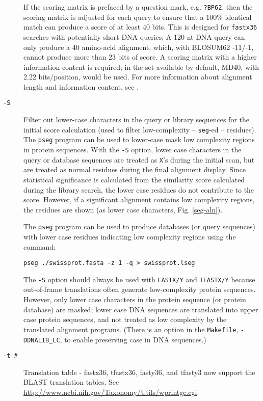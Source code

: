 \documentclass[11pt]{article}
\begin{document}
\begin{description}
If the scoring matrix is prefaced by a question mark,
e.g. \texttt{?BP62}, then the scoring matrix is adjusted for each
query to ensure that a 100\% identical match can produce a score of at
least 40 bits.  This is designed for \texttt{fastx36} searches with
potentially short DNA queries; A 120 nt DNA query can only produce a
40 amino-acid alignment, which, with BLOSUM62 -11/-1, cannot produce
more than 23 bits of score. A scoring matrix with a higher information
content is required; in the set available by default, MD40, with 2.22
bits/position, would be used.  For more information about alignment
length and information content, see \cite{alt915}.

\item[\texttt{-S}] Filter out lower-case characters in the query or
  library sequences for the initial score calculation (used to filter
  low-complexity -- \texttt{seg}-ed -- residues).  The \texttt{pseg}
  program \cite{woo935} can be used to lower-case mask low complexity
  regions in protein sequences. With the \texttt{-S} option, lower
  case characters in the query or database sequences are treated as
  \texttt{X}'s during the initial scan, but are treated as normal
  residues during the final alignment display.  Since statistical
  significance is calculated from the similarity score calculated
  during the library search, the lower case residues do not contribute
  to the score.  However, if a significant alignment contains low
  complexity regions, the residues are shown (as lower
  case characters, Fig. \ref{seg-aln}).

The \texttt{pseg} program can be used to produce databases (or query
sequences) with lower case residues indicating low complexity regions
using the command:
\begin{verbatim}
pseg ./swissprot.fasta -z 1 -q > swissprot.lseg
\end{verbatim}

The \texttt{-S} option should always be used with \texttt{FASTX/Y} and
\texttt{TFASTX/Y} because out-of-frame translations often generate
low-complexity protein sequences.  However, only lower case characters
in the protein sequence (or protein database) are masked; lower case
DNA sequences are translated into upper case protein sequences, and
not treated as low complexity by the translated alignment
programs. (There is an option in the \texttt{Makefile},
\texttt{-DDNALIB\_LC}, to enable preserving case in DNA sequences.)

\item[\texttt{-t \#}]
Translation table - fastx36, tfastx36, fasty36, and
tfasty3 now support the BLAST translation tables.  See
\url{http://www.ncbi.nih.gov/Taxonomy/Utils/wprintgc.cgi}.


\end{description}
\end{document}
